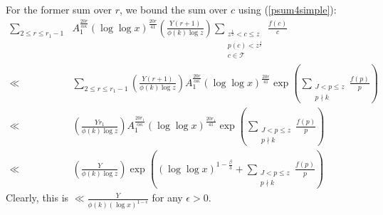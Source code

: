 \documentclass{amsart}
\begin{document}
For the former sum over $r$, we bound the sum over $c$ using (\ref{psum4simple}):
\begin{align*}
\sum_{2\leq r\leq r_1-1}&A_1^{\frac{20r}{\alpha\kappa}}\left(\log\log x\right)^{\frac{20r}{41}}\left(\frac{Y(r+1)}{\phi(k)\log z}\right)\sum_{\substack{z^\frac 12<c\leq z \\ p(c)<z^\frac 1r \\ c\in \mathcal T}}\frac{f(c)}{c}\\
\ll &\sum_{2\leq r\leq r_1-1}\left(\frac{Y(r+1)}{\phi(k)\log z}\right)A_1^{\frac{20r}{\alpha\kappa}}\left(\log\log x\right)^{\frac{20r}{41}}\exp\left(\sum_{\substack{J<p\leq z \\ p\nmid k}}\frac{f(p)}{p}\right)\\
\ll &\left(\frac{Yr_1}{\phi(k)\log z}\right)A_1^{\frac{20r_1}{\alpha\kappa}}\left(\log\log x\right)^{\frac{20r_1}{41}}\exp\left(\sum_{\substack{J<p\leq z \\ p\nmid k}}\frac{f(p)}{p}\right)\\
\ll &\left(\frac{Y}{\phi(k)\log z}\right)\exp\left((\log\log x)^{1-\frac{\beta}{3}}+\sum_{\substack{J<p\leq z \\ p\nmid k}}\frac{f(p)}{p}\right)
\end{align*}
Clearly, this is $\ll \frac{Y}{\phi(k)(\log x)^{1-\epsilon}}$ for any $\epsilon>0$.

\end{document}
